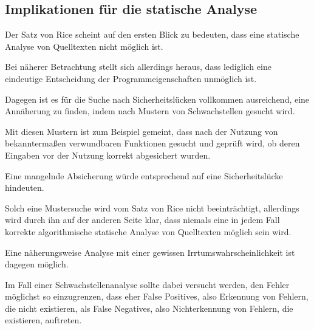 

        \subsection{Implikationen für die statische Analyse}\label{Implikationen für die statische Analyse}
            Der Satz von Rice scheint auf den ersten Blick zu bedeuten,
            dass eine statische Analyse von Quelltexten nicht möglich ist.

            Bei näherer Betrachtung stellt sich allerdings heraus,
            dass lediglich eine eindeutige Entscheidung der Programmeigenschaften unmöglich ist.

            Dagegen ist es für die Suche nach Sicherheitslücken vollkommen ausreichend,
            eine Annäherung zu finden,
            indem nach Mustern von Schwachstellen gesucht wird.

            Mit diesen Mustern ist zum Beispiel gemeint,
            dass nach der Nutzung von bekanntermaßen verwundbaren Funktionen gesucht und
            geprüft wird,
            ob deren Eingaben vor der Nutzung korrekt abgesichert wurden.

            Eine mangelnde Absicherung würde entsprechend auf eine Sicherheitslücke hindeuten.

            Solch eine Mustersuche wird vom Satz von Rice nicht beeinträchtigt,
            allerdings wird durch ihn auf der anderen Seite klar,
            dass niemals eine in jedem Fall korrekte algorithmische statische Analyse von Quelltexten möglich sein wird.

            Eine näherungsweise Analyse mit einer gewissen Irrtumswahrscheinlichkeit ist dagegen möglich.

            Im Fall einer Schwachstellenanalyse sollte dabei versucht werden,
            den Fehler möglichst so einzugrenzen,
            dass eher False Positives,
            also Erkennung von Fehlern,
            die nicht existieren,
            als False Negatives,
            also Nichterkennung von Fehlern,
            die existieren,
            auftreten.

